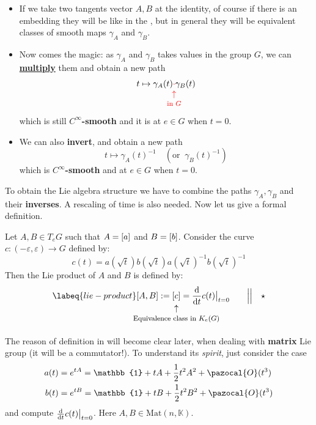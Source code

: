 \documentclass[../main.tex]{subfiles}
\begin{document}
\begin{itemize}
    \item If we take two tangents vector $A,B$ at the identity, of course if there is an embedding they will be like in the , but in general they will be equivalent classes of smooth maps $\gamma_A$ and $\gamma_B$.
    \item Now comes the magic: as $\gamma_A$ and $\gamma_B$ takes values in the group $G$, we can \underline{\textbf{multiply}} them and obtain a new path
    \[
    t \mapsto \gamma_A(t) {\color{red}\underset{\mathclap{\tikz \node {$\uparrow$} node [below=1ex] {\footnotesize in $G$ };}}{\cdot}}\gamma_B(t)
    \]
    which is still $C^\infty$\textbf{-smooth} and it is at $e\in G$ when $t=0$.
    \item We can also \textbf{invert}, and obtain a new path
    \[
    t \mapsto \gamma_A(t)^{-1} \quad (\textrm{or }\ \gamma_B(t)^{-1})
    \]
    which is $C^\infty$\textbf{-smooth} and  at $e\in G$ when $t=0$.
\end{itemize} 
To obtain the Lie algebra structure we have to combine the paths $\gamma_A, \gamma_B$ and their \textbf{inverses}. A rescaling of time is also needed. Now let us give a formal definition.
\begin{definition}
Let $A,B\in T_eG$ such that $A=\bqty{a}$ and $B=\bqty{b}$. Consider the curve $c:(-\varepsilon,\varepsilon)\to G$ defined by:
\[
c(t)=a(\sqrt{t})b(\sqrt{t})a(\sqrt{t})^{-1}b(\sqrt{t})^{-1}
\]
Then the Lie product of $A$ and $B$ is defined by:
\begin{equation}\labeq{lie-product}
    \comm{A}{B}:=\underset{\mathclap{\tikz \node {$\uparrow$} node [below=1ex] {\footnotesize Equivalence class in $K_e(G)$ };}}{\bqty{c}}=\dv{t}c(t)\big|_{t=0} \qquad \Big|\Big| \quad \star 
\end{equation}
\end{definition}
\begin{kaobox}[frametitle=Remark]
The reason of definition in  will become clear later, when dealing with \textbf{matrix} Lie group (it will be a commutator!). To understand its \textit{spirit}, just consider the case
\[
\begin{split}
    a(t)&=e^{tA}=\mathbb{1}+tA+\frac{1}{2}t^2A^2+\pazocal{O}(t^3)\\
    b(t)&=e^{tB}=\mathbb{1}+tB+\frac{1}{2}t^2B^2+\pazocal{O}(t^3)
\end{split}
\]
and compute $\dv{t}c(t)\big|_{t=0}$. Here $A,B\in\textrm{Mat}(n,\mathbb{K})$.
\end{kaobox}
\end{document}
